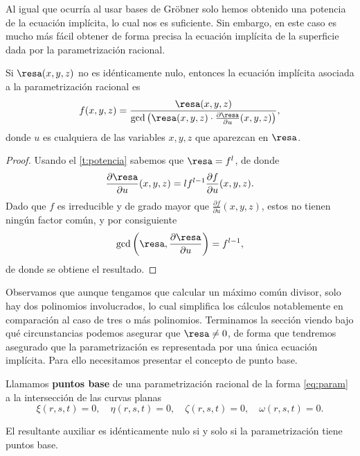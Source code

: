 Al igual que ocurría al usar bases de Gröbner solo hemos obtenido una potencia de la ecuación implícita, lo cual nos es suficiente. Sin embargo, en este caso es mucho más fácil obtener de forma precisa la ecuación implícita de la superficie dada por la parametrización racional.
\begin{teorema}\label{t:resDef}
    Si $\resa(x,y,z)$ no es idénticamente nulo, entonces la ecuación implícita asociada a la parametrización racional es
    \begin{equation*}
        f(x,y,z) = \frac{\resa(x,y,z)}{\gcd\left( \resa(x,y,z)\cdot \frac{\partial \resa}{\partial u}(x,y,z)  \right)},
    \end{equation*}
    donde $u$ es cualquiera de las variables $x,y,z$ que aparezcan en $\resa$.  
\end{teorema}
\begin{proof}
    Usando el \autoref{t:potencia} sabemos que $\resa = f^l$, de donde
    \begin{equation*}
         \frac{\partial \resa}{\partial u}(x,y,z) = lf^{l-1} \frac{\partial f}{\partial u}(x,y,z).
    \end{equation*}
    Dado que $f$ es irreducible y de grado mayor que $ \frac{\partial f}{\partial u}(x,y,z)$, estos no tienen ningún factor común, y por consiguiente
    \begin{equation*}
        \gcd\left( \resa, \frac{\partial \resa}{\partial u}\right) = f^{l-1},
    \end{equation*}
    de donde se obtiene el resultado.
\end{proof}

Observamos que aunque tengamos que calcular un máximo común divisor, solo hay dos polinomios involucrados, lo cual simplifica los cálculos notablemente en comparación al caso de tres o más polinomios. Terminamos la sección viendo bajo qué circunstancias podemos asegurar que $\resa \neq 0$, de forma que tendremos asegurado que la parametrización es representada por una única ecuación implícita. Para ello necesitamos presentar el concepto de punto base.
\begin{definicion}
    Llamamos \textbf{puntos base} de una parametrización racional de la forma \eqref{eq:param} a la intersección de las curvas planas
    \begin{equation*}
       \xi(r,s,t) = 0,\quad \eta(r,s,t) = 0,\quad \zeta(r,s,t)=0,\quad \omega(r,s,t)=0.
    \end{equation*}
\end{definicion}
\begin{teorema}
    El resultante auxiliar es idénticamente nulo si y solo si la parametrización tiene puntos base.
\end{teorema}

